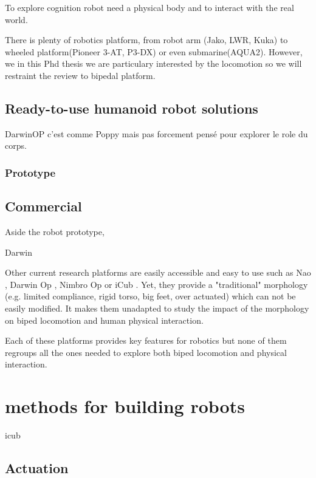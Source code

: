 To explore cognition robot need a physical body and to interact with the real world.


There is plenty of robotics platform, from robot arm (Jako, LWR, Kuka) to wheeled platform(Pioneer 3-AT, P3-DX) or even submarine(AQUA2). However, we in this Phd thesis we are particulary interested by the locomotion so we will restraint the review to bipedal platform.

\subsection{Ready-to-use humanoid robot solutions} %


DarwinOP c'est comme Poppy mais pas forcement pensé pour explorer le role du corps.

\subsubsection{Prototype} %

\subsection{Commercial} %

Aside the robot prototype,

Darwin \parencite{ha2011development}

Other current research platforms are easily accessible and easy to use such as Nao \parencite{gouaillier2008nao}, Darwin Op \parencite{ha2011development}, Nimbro Op \parencite{schwarznimbro} or iCub \parencite{metta2008icub}.
Yet, they provide a "traditional" morphology (e.g.
limited compliance, rigid torso, big feet, over actuated) which can not be easily modified.
It makes them unadapted to study the impact of the morphology on biped locomotion and human physical interaction.

Each of these platforms provides key features for robotics but none of them regroups all the ones needed to explore both biped locomotion and physical interaction.

\section{methods for building robots} %
icub~\parencite{tsagarakis2007icub}

\subsection{Actuation} %


